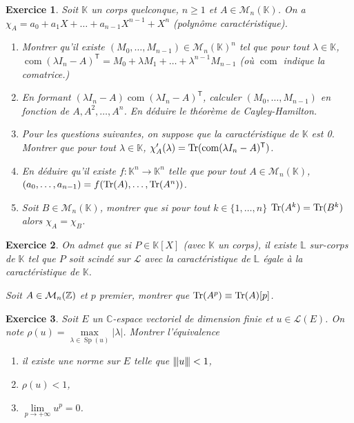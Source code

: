 \documentclass[12pt]{article}
\newtheorem{exercise}{Exercice}[section]
\theoremstyle{remark}
\theoremstyle{remark}
\newcommand{\K}{\mathbb{K}} \newcommand{\R}{\mathbb{R}}
\newcommand{\C}{\mathbb{C}} \newcommand{\Q}{\mathbb{Q}}
\newcommand{\M}{\mathcal{M}} \renewcommand{\L}{\mathcal{L}}
\DeclareMathOperator{\Sp}{Sp} \DeclareMathOperator{\mat}{mat}
\DeclareMathOperator{\com}{com} \DeclareMathOperator{\conv}{conv}
\newcommand{\vertiii}[1]{{\left\vert\kern-0.25ex\left\vert\kern-0.25ex\left\vert{}#1
\right\vert\kern-0.25ex\right\vert\kern-0.25ex\right\vert}}
\begin{document}
\begin{exercise}
	Soit $\K$ un corps quelconque, $n\geqslant1$ et $A\in\M_{n}(\K)$. On a $\chi_{A}=a_{0}+a_{1}X+\dots+a_{n-1}X^{n-1}+X^{n}$ (polynôme caractéristique).
	\begin{enumerate}
		\item Montrer qu'il existe $(M_{0},\dots,M_{n-1})\in\M_{n}(\K)^{n}$ tel que pour tout $\lambda\in\K$, $\com(\lambda I_{n}-A)^{\mathsf{T}}=M_{0}+\lambda M_{1}+\dots+\lambda^{n-1}M_{n-1}$ (où $\com$ indique la comatrice.)
		\item En formant $(\lambda I_{n}-A)\com(\lambda I_{n}-A)^{\mathsf{T}}$, calculer $(M_{0},\dots,M_{n-1})$ en fonction de $A,A^{2},\dots,A^{n}$. En déduire le théorème de Cayley-Hamilton.
		\item Pour les questions suivantes, on suppose que la caractéristique de $\K$ est 0. Montrer que pour tout $\lambda\in\K$, $\chi_{A}'(\lambda)=\Tr(\com(\lambda I_{n}-A)^{\mathsf{T}})$.
		\item En déduire qu'il existe $f:\K^{n}\to\K^{n}$ telle que pour tout $A\in\M_{n}(\K)$, $(a_{0},\dots,a_{n-1}) = f(\operatorname{Tr}(A),\dots,\operatorname{Tr}(A^{n}))$.
		\item Soit $B\in\M_{n}(\K)$, montrer que si pour tout $k\in\{1,\dots,n\}$ $\operatorname{Tr}(A^{k})=\operatorname{Tr}(B^{k})$ alors $\chi_{A}=\chi_{B}$.
	\end{enumerate}
\end{exercise}

\begin{exercise}
	On admet que si $P\in\K[X]$ (avec $\K$ un corps), il existe $\mathbb{L}$ sur-corps de $\K$ tel que $P$ soit scindé sur $\L$ avec la caractéristique de $\mathbb{L}$ égale à la caractéristique de $\K$.

	Soit $A\in\M_{n}(\Z)$ et $p$ premier, montrer que $\operatorname{Tr}(A^{p})\equiv\operatorname{Tr}(A)[p]$.
\end{exercise}

\begin{exercise}
	Soit $E$ un $\C$-espace vectoriel de dimension finie et $u\in\L(E)$. On note $\rho(u)=\max\limits_{\lambda\in\Sp(u)}\vert \lambda\vert$. Montrer l'équivalence
	\begin{enumerate}
		\item [(i)] il existe une norme sur $E$ telle que $\vertiii{u}<1$,
		\item [(ii)] $\rho(u)<1$,
		\item [(iii)] $\lim\limits_{p\to+\infty}u^{p}=0$.
	\end{enumerate}
\end{exercise}
\end{document}
